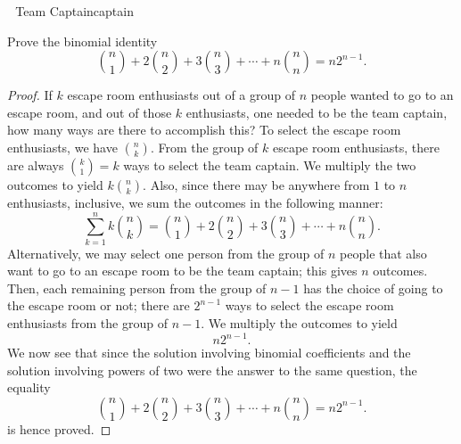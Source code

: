     \pagebreak
    \begin{example}{\Difficulty\,\Difficulty\,\Difficulty\,\,Team Captain}{captain}
        
        Prove the binomial identity
        \begin{equation*}
            \binom{n}{1}+2\binom{n}{2}+3\binom{n}{3}+\cdots+n\binom{n}{n}=n2^{n-1}.
        \end{equation*}
        \begin{proof}
            If \(k\) escape room enthusiasts out of a group of \(n\) people wanted to go to an escape room, and out of those \(k\) enthusiasts, one needed to be the team captain, how many ways are there to accomplish this? To select the escape room enthusiasts, we have \(\binom{n}{k}\). From the group of \(k\) escape room enthusiasts, there are always \(\binom{k}{1}=k\) ways to select the team captain. We multiply the two outcomes to yield \(k\binom{n}{k}\). Also, since there may be anywhere from \(1\) to \(n\) enthusiasts, inclusive, we sum the outcomes in the following manner:
            \begin{equation*}
                \sum_{k=1}^n k\binom{n}{k}=\binom{n}{1}+2\binom{n}{2}+3\binom{n}{3}+\cdots+n\binom{n}{n}.
            \end{equation*}
            Alternatively, we may select one person from the group of \(n\) people that also want to go to an escape room to be the team captain; this gives \(n\) outcomes. Then, each remaining person from the group of \(n-1\) has the choice of going to the escape room or not; there are \(2^{n-1}\) ways to select the escape room enthusiasts from the group of \(n-1\). We multiply the outcomes to yield 
            \begin{equation*}
                n2^{n-1}.
            \end{equation*}
            We now see that since the solution involving binomial coefficients and the solution involving powers of two were the answer to the same question, the equality
            \begin{equation*}
                \binom{n}{1}+2\binom{n}{2}+3\binom{n}{3}+\cdots+n\binom{n}{n}=n2^{n-1}.
            \end{equation*}
            is hence proved.
        \end{proof}
        
    \end{example}
